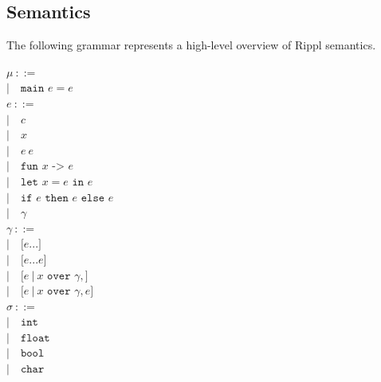 \documentclass[5pt]{article}
\begin{document}
\subsection{Semantics}
The following grammar represents a high-level overview of Rippl semantics.
\begin{multicols}{2}
\noindent $\mu \ ::= $ \\
\hspace*{10mm} $| \quad \texttt{main } e = e$ \\

\noindent $e \ ::= $ \\
\hspace*{10mm} $| \quad c$ \\
\hspace*{10mm} $| \quad x$ \\
\hspace*{10mm} $| \quad e \ e$ \\
\hspace*{10mm} $| \quad \texttt{fun } x \texttt{ -> } e$ \\
\hspace*{10mm} $| \quad \texttt{let }x = e \texttt{ in } e$ \\
\hspace*{10mm} $| \quad \texttt{if } e \texttt{ then } e \texttt{ else } e$ \\
\hspace*{10mm} $| \quad \gamma$ \\

\noindent $\gamma \ ::= $ \\
\hspace*{10mm} $| \quad \texttt{[}e...\texttt{]}$ \\
\hspace*{10mm} $| \quad \texttt{[}e...e\texttt{]}$ \\
\hspace*{10mm} $| \quad \texttt{[}e \ | \ x \texttt{ over } \gamma, \texttt{]}$ \\
\hspace*{10mm} $| \quad \texttt{[}e \ | \ x \texttt{ over } \gamma, e \texttt{]}$ \\

\noindent $\sigma \ ::= $ \\
\hspace*{10mm} $| \quad \texttt{int}$ \\
\hspace*{10mm} $| \quad \texttt{float}$ \\
\hspace*{10mm} $| \quad \texttt{bool}$ \\
\hspace*{10mm} $| \quad \texttt{char}$ \\


\end{multicols}
\end{document}
